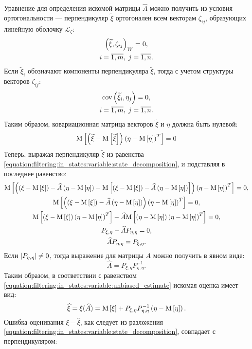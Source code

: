 Уравнение для определения искомой матрицы $\widehat{A}$ можно получить из условия ортогональности --- перпендикуляр $\widetilde{\xi}$ ортогонален всем векторам
$\zeta_{ij}$, образующих линейную оболочку $\mathcal{L}_\zeta$:
\begin{gather*}
	\left ( \widetilde{\xi} , \zeta_{ij} \right )_{W} = 0 , \\
	i = \overline{1,m} , \; j = \overline{1,n} .
\end{gather*}
Если $\widetilde{\xi}_i$ обозначают компоненты перпендикуляра $\widetilde{\xi}$, тогда с учетом структуры векторов $\zeta_{ij}$:
\begin{gather*}
	\mathrm{cov} \left ( \widetilde{\xi}_i, \eta_j \right ) = 0 , \\
	i = \overline{1,m} , \; j = \overline{1,n} .
\end{gather*}
Таким образом, ковариационная матрица векторов $\widetilde{\xi}$ и $\eta$ должна быть нулевой:
\begin{equation} \label{equation:filtering:in_states:variable:error_and_observation_orthogonality}
	\mathrm{M} \left [ \left ( \widetilde{\xi} - \mathrm{M} \left [ \widetilde{\xi} \right ] \right ) \left ( \eta - \mathrm{M} \left [ \eta \right ] \right )^T \right ] = 0
\end{equation}
Теперь, выражая перпендикуляр $\widetilde{\xi}$ из равенства \eqref{equation:filtering:in_states:variable:state_decomposition}, и подставляя в последнее равенство:
\begin{gather*}
	\mathrm{M} \left [ \left ( \left ( \xi - \mathrm{M} \left [ \xi \right ] \right ) - \widehat{A} \left ( \eta - \mathrm{M} \left [ \eta \right ] \right ) - \mathrm{M} \left [ \left ( \xi - \mathrm{M} \left [ \xi \right ] \right ) - \widehat{A} \left ( \eta - \mathrm{M} \left [ \eta \right ] \right ) \right ] \right ) \left ( \eta - \mathrm{M} \left [ \eta \right ] \right )^T \right ] = 0 , \\
	\mathrm{M} \left [ \left ( \left ( \xi - \mathrm{M} \left [ \xi \right ] \right ) - \widehat{A} \left ( \eta - \mathrm{M} \left [ \eta \right ] \right ) \right ) \left ( \eta - \mathrm{M} \left [ \eta \right ] \right )^T \right ] = 0 , \\
	\mathrm{M} \left [ \left ( \xi - \mathrm{M} \left [ \xi \right ] \right ) \left ( \eta - \mathrm{M} \left [ \eta \right ] \right )^T \right ] - \widehat{A} \mathrm{M} \left [ \left ( \eta - \mathrm{M} \left [ \eta \right ] \right ) \left ( \eta - \mathrm{M} \left [ \eta \right ] \right )^T \right ] = 0 , \\
	P_{\xi, \eta} - \widehat{A} P_{\eta, \eta} = 0 , \\
	\widehat{A} P_{\eta, \eta} = P_{\xi, \eta} .
\end{gather*}
Если $\left | P_{\eta, \eta} \right | \neq 0$, тогда выражение для матрицы $A$ можно получить в явном виде:
$$
	\widehat{A} = P_{\xi, \eta} P_{\eta, \eta}^{-1} .
$$
Таким образом, в соответствии с равенством \eqref{equation:filtering:in_states:variable:unbiased_estimate} искомая оценка имеет вид:
\begin{equation} \label{equation:filtering:in_states:variable:optimal_estimate}
	\widehat{\xi}
		= \xi(\widehat{A})
		= \mathrm{M} \left [ \xi \right ] + P_{\xi, \eta} P_{\eta, \eta}^{-1} \left ( \eta - \mathrm{M} \left [ \eta \right ] \right ) .
\end{equation}
Ошибка оценивания $\xi - \widehat{\xi}$, как следует из разложения \eqref{equation:filtering:in_states:variable:state_decomposition}, совпадает с перпендикуляром:
